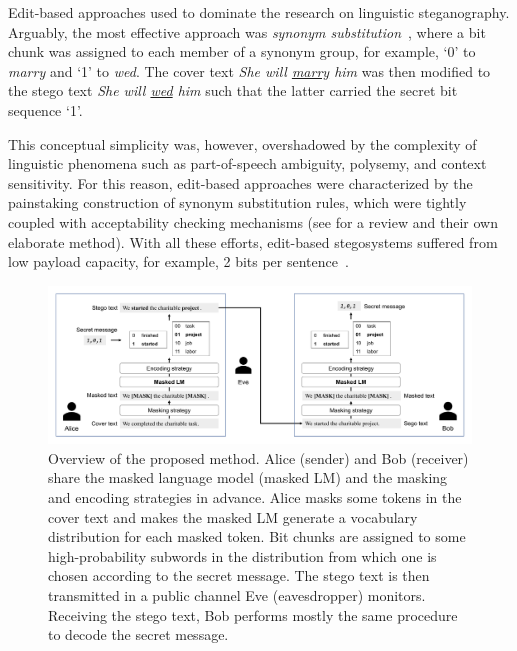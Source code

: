 \documentclass[11pt]{article}
\begin{document}
Edit-based approaches used to dominate the research on linguistic steganography.
Arguably, the most effective approach was \textit{synonym substitution}~\citep{Chapman2001,Bolshakov2005,Taskiran2006,chang-clark-2014-practical,Wilson:2016}, where a bit chunk was assigned to each member of a synonym group, for example, `0' to \textit{marry} and `1' to \textit{wed}.
The cover text \textit{She will \underline{marry} him} was then modified to the stego text \textit{She will \underline{wed} him} such that the latter carried the secret bit sequence `1'.

This conceptual simplicity was, however, overshadowed by the complexity of linguistic phenomena such as part-of-speech ambiguity, polysemy, and context sensitivity.
For this reason, edit-based approaches were characterized by the painstaking construction of synonym substitution rules, which were tightly coupled with acceptability checking mechanisms (see \citet{chang-clark-2014-practical} for a review and their own elaborate method).
With all these efforts, edit-based stegosystems suffered from low payload capacity, for example, 2 bits per sentence~\citep{chang-clark-2014-practical}.

\begin{figure}[t]
    \centering
    \includegraphics[width=0.97\linewidth]{images/bert-flow.pdf}
    \caption{
    Overview of the proposed method.
    Alice (sender) and Bob (receiver) share the masked language model (masked LM) and the masking and encoding strategies in advance.
    Alice masks some tokens in the cover text and makes the masked LM generate a vocabulary distribution for each masked token.
    Bit chunks are assigned to some high-probability subwords in the distribution from which one is chosen according to the secret message.
    The stego text is then transmitted in a public channel Eve (eavesdropper) monitors.
    Receiving the stego text, Bob performs mostly the same procedure to decode the secret message.
    } \label{fig:bert-flow}
\end{figure}
\end{document}
